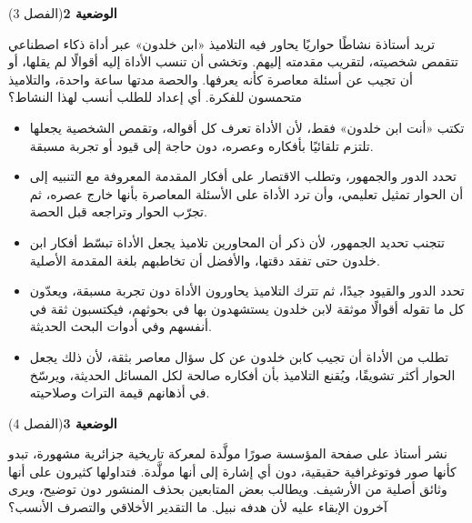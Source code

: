 \documentclass[11pt,a4paper]{article}
\begin{document}
\par\vspace{6pt}
\noindent
{\large\khatt\textbf{الوضعية 2}}\hfill{\small(الفصل 3)}\par\nopagebreak\vspace{3pt}
\setlength{\fboxsep}{7pt}\colorbox{gray!10}{\parbox{\dimexpr\linewidth-14pt}{تريد أستاذة نشاطًا حواريًا يحاور فيه التلاميذ «ابن خلدون» عبر أداة ذكاء اصطناعي تتقمص شخصيته، لتقريب مقدمته إليهم. وتخشى أن تنسب الأداة إليه أقوالًا لم يقلها، أو أن تجيب عن أسئلة معاصرة كأنه يعرفها. والحصة مدتها ساعة واحدة، والتلاميذ متحمسون للفكرة. أي إعداد للطلب أنسب لهذا النشاط؟}}\par\nopagebreak
\begin{itemize}[leftmargin=1.0cm, labelsep=6pt, itemsep=3pt, topsep=4pt, parsep=0pt]
  \item[\textbf{أ)}] تكتب «أنت ابن خلدون» فقط، لأن الأداة تعرف كل أقواله، وتقمص الشخصية يجعلها تلتزم تلقائيًا بأفكاره وعصره، دون حاجة إلى قيود أو تجربة مسبقة.
  \item[\textbf{ب)}] تحدد الدور والجمهور، وتطلب الاقتصار على أفكار المقدمة المعروفة مع التنبيه إلى أن الحوار تمثيل تعليمي، وأن ترد الأداة على الأسئلة المعاصرة بأنها خارج عصره، ثم تجرّب الحوار وتراجعه قبل الحصة.
  \item[\textbf{ج)}] تتجنب تحديد الجمهور، لأن ذكر أن المحاورين تلاميذ يجعل الأداة تبسّط أفكار ابن خلدون حتى تفقد دقتها، والأفضل أن تخاطبهم بلغة المقدمة الأصلية.
  \item[\textbf{د)}] تحدد الدور والقيود جيدًا، ثم تترك التلاميذ يحاورون الأداة دون تجربة مسبقة، ويعدّون كل ما تقوله أقوالًا موثقة لابن خلدون يستشهدون بها في بحوثهم، فيكتسبون ثقة في أنفسهم وفي أدوات البحث الحديثة.
  \item[\textbf{هـ)}] تطلب من الأداة أن تجيب كابن خلدون عن كل سؤال معاصر بثقة، لأن ذلك يجعل الحوار أكثر تشويقًا، ويُقنع التلاميذ بأن أفكاره صالحة لكل المسائل الحديثة، ويرسّخ في أذهانهم قيمة التراث وصلاحيته.
\end{itemize}
\par\vspace{6pt}
\noindent
{\large\khatt\textbf{الوضعية 3}}\hfill{\small(الفصل 4)}\par\nopagebreak\vspace{3pt}
\setlength{\fboxsep}{7pt}\colorbox{gray!10}{\parbox{\dimexpr\linewidth-14pt}{نشر أستاذ على صفحة المؤسسة صورًا مولَّدة لمعركة تاريخية جزائرية مشهورة، تبدو كأنها صور فوتوغرافية حقيقية، دون أي إشارة إلى أنها مولَّدة. فتداولها كثيرون على أنها وثائق أصلية من الأرشيف. ويطالب بعض المتابعين بحذف المنشور دون توضيح، ويرى آخرون الإبقاء عليه لأن هدفه نبيل. ما التقدير الأخلاقي والتصرف الأنسب؟}}\par\nopagebreak
\end{document}
